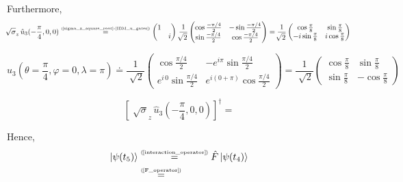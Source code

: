 \documentclass[11pt]{article}
\numberwithin{equation}{section} %
\numberwithin{figure}{section} %
\newcommand\numeq[1] %
  {\stackrel{\scriptscriptstyle(\mkern-1.5mu#1\mkern-1.5mu)}{=}}
\begin{document}
\begin{appendices}
Furthermore, 
\begin{equation}
\sqrt[]{\sigma}_z\,\hat{u}_3(-\frac{\pi}{4},0,0) \numeq{\textrm{\ref{sigma_z_square_root}-\ref{IBM_u_gates}}}  \begin{pmatrix}1&\\&i\end{pmatrix}\,\frac{1}{\sqrt[]{2}}\begin{pmatrix} \cos\frac{-\pi/4}{2}&-\sin\frac{-\pi/4}{2}\\\sin\frac{-\pi/4}{2}&\cos\frac{-\pi/4}{2} \end{pmatrix} = \frac{1}{\sqrt[]{2}}\begin{pmatrix} \cos\frac{\pi}{8}&\sin\frac{\pi}{8}\\-i\sin\frac{\pi}{8}&i\cos\frac{\pi}{8} \end{pmatrix}
\end{equation}

\begin{equation}
\hat{u}_3 (\theta=\frac{\pi}{4},\varphi=0,\lambda=\pi)\doteq \frac{1}{\sqrt[]{2}}\begin{pmatrix} \cos\frac{\pi/4}{2}&-e^{i\pi}\sin\frac{\pi/4}{2}\\e^{i\,0}\sin\frac{\pi/4}{2}&e^{i(0+\pi)}\cos\frac{\pi/4}{2} \end{pmatrix} = \frac{1}{\sqrt[]{2}}\begin{pmatrix} \cos\frac{\pi}{8}&\sin\frac{\pi}{8}\\ \sin\frac{\pi}{8}&-\cos\frac{\pi}{8} \end{pmatrix}
\end{equation}

\begin{equation}
\left[\sqrt[]{\sigma}_z\,\hat{u}_3(-\frac{\pi}{4},0,0)\right]^\dagger = 
\end{equation}


\vspace{0.60cm}
Hence, 
\begin{equation} \label{psi_t5}
\begin{split}
\ket{\psi(t_5)}
&	\numeq{\textrm{\ref{interaction_operator}}}  \hat{F}\ket{\psi(t_4)}\\
& \numeq{\textrm{\ref{F_operator}}}
\end{split}
\end{equation}












\end{appendices}
\end{document}
